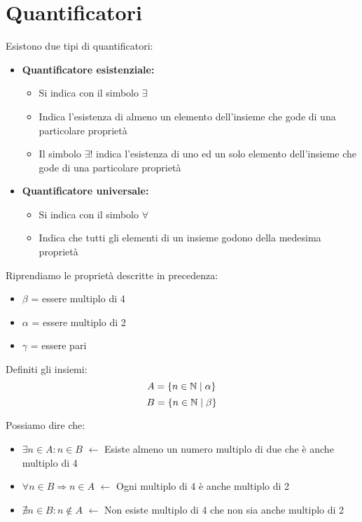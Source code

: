 \section{Quantificatori}


Esistono due tipi di quantificatori:
\begin{itemize}
    \item \textbf{Quantificatore esistenziale:}
    \begin{itemize}
        \item Si indica con il simbolo $\exists$
        \item Indica l'esistenza di almeno un elemento dell'insieme che gode di una particolare proprietà
        \item Il simbolo $\exists!$ indica l'esistenza di uno ed un solo elemento dell'insieme che gode di una particolare proprietà
    \end{itemize}
    \item \textbf{Quantificatore universale:}
    \begin{itemize}
        \item Si indica con il simbolo $\forall$
        \item Indica che tutti gli elementi di un insieme godono della medesima proprietà
    \end{itemize}
\end{itemize}

Riprendiamo le proprietà descritte in precedenza:
\begin{itemize}
    \item $\beta$ = essere multiplo di 4
    \item $\alpha$ = essere multiplo di 2
    \item $\gamma$ = essere pari
\end{itemize}

Definiti gli insiemi:
\[
A = \{n \in \mathbb{N} \mid \alpha\}
\]
\[
B = \{n \in \mathbb{N} \mid \beta\}
\]

Possiamo dire che:
\begin{itemize}
    \item $\exists n \in A : n \in B$ $\leftarrow$ Esiste almeno un numero multiplo di due che è anche multiplo di 4
    \item $\forall n \in B \Rightarrow n \in A$ $\leftarrow$ Ogni multiplo di 4 è anche multiplo di 2
    \item $\nexists n \in B : n \notin A$ $\leftarrow$ Non esiste multiplo di 4 che non sia anche multiplo di 2
\end{itemize}

